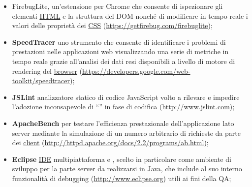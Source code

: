 {\begin{itemize}
   \begin{itemize}
   \item la sezione Sources che rappresenta un'interfaccia al \underline{} per il motore \underline{JavaScript} V8 e consente di impostare \underline{} (assoluti o condizionali) per seguire l'esecuzione del codice passo passo (con le consuete funzioni di \underline{``step over''}, \underline{``step into''} e \underline{``step out''}) nonché arrestare temporaneamente l'esecuzione al sollevamento di un'eccezione (o di un'eccezione non controllata);
   \item la sezione  che permette di quantificare i tempi necessari al caricamento e all'esecuzione degli script, nonché di tracciare l'utilizzo della memoria e forzare l'invocazione del ;
   \item  gli strumenti di benchmark accessibili dalla sezione \underline{Profiles}, vale a dire il  della CPU, che permette di ricostruire l'albero delle chiamate di funzione e la percentuale di utilizzo della CPU per ciascuna funzione, e il  dello , mediante il quale è possibile ispezionare il contenuto dello  e salvarne delle rappresentazioni istantanee;
   \end{itemize}
  \item FirebugLite, un'estensione per Chrome che consente di ispezionare gli elementi \underline{HTML} e la struttura del DOM nonché di modificare in tempo reale i valori delle proprietà dei \underline{CSS} (\url{https://getfirebug.com/firebuglite});
  \item \textbf{SpeedTracer} uno strumento che consente di identificare i problemi di prestazioni nelle applicazioni web visualizzando una serie di metriche in tempo reale grazie all'analisi dei dati resi disponibili a livello di motore di rendering del \underline{browser} (\url{https://developers.google.com/web-toolkit/speedtracer});
  \item \textbf{JSLint} analizzatore statico di codice JavaScript volto a rilevare e impedire l'adozione inconsapevole di ``\underline{}'' in fase di codifica (\url{http://www.jslint.com});
  \item \textbf{ApacheBench} per testare l'efficienza prestazionale dell'applicazione lato server mediante la simulazione di un numero arbitrario di richieste da parte dei \underline{client} (\url{http://httpd.apache.org/docs/2.2/programs/ab.html});
  \item \textbf{Eclipse} \underline{IDE} multipiattaforma e , scelto in particolare come ambiente di sviluppo per la parte server da realizzarsi in \underline{Java}, che include al suo interno funzionalità di debugging (\url{http://www.eclipse.org}) utili ai fini della QA;

\end{itemize}}
